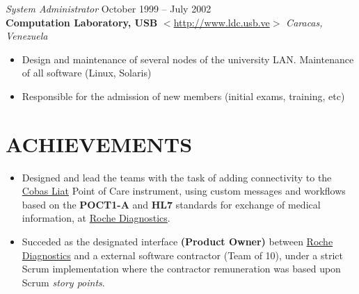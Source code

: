 \documentclass[line,margin]{res}
\begin{document}
\begin{resume}
                {\sl System Administrator} \hfill October 1999 -- July 
                2002 \\
                \textbf{Computation Laboratory, USB} 
                $<$\url{http://www.ldc.usb.ve}$>$
                \hfill \textit{Caracas, Venezuela}
                \begin{itemize}  \itemsep 2pt %
                \item Design and maintenance of several nodes of the university 
                LAN. Maintenance of all software (Linux, Solaris) 
                \item Responsible for the admission of new members (initial exams, training, etc)              
                \end{itemize}

\section{ACHIEVEMENTS}   
                \begin{itemize}  \itemsep 2pt %
                \item Designed and lead the teams with the task of adding connectivity to the \href{https://www.cobasliat.com/}{\textsuperscript{\textregistered}Cobas \textsuperscript{\textregistered}Liat} Point of Care instrument, using custom messages and workflows based on the \textbf{POCT1-A} and \textbf{HL7} standards for exchange 
                 of medical information, at \href{http://www.roche.com}{Roche Diagnostics}.

                \item Succeded as the designated interface \textbf{(Product Owner)} between \href{http://www.roche.com}{Roche Diagnostics} and a external software contractor (Team of 10), 
                under a strict Scrum implementation where the contractor remuneration was based upon Scrum \textit{story points}.


\end{itemize}
\end{resume}
\end{document}
